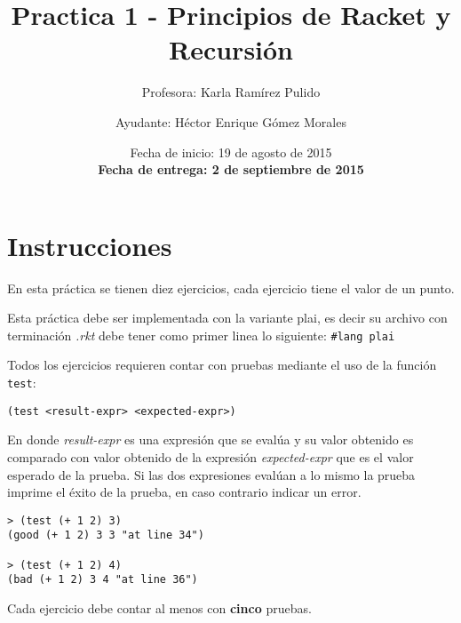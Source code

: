 \documentclass{article}
\author{Profesora: Karla Ramírez Pulido \and
  Ayudante: Héctor Enrique Gómez Morales}
\title{Practica 1 - Principios de Racket y Recursión}
\date{Fecha de inicio: 19 de agosto de 2015\\
  \textbf{Fecha de entrega: 2 de septiembre de 2015}}
\begin{document}
\maketitle
\section{Instrucciones}
En esta práctica se tienen diez ejercicios, cada ejercicio
tiene el valor de un punto.

Esta práctica debe ser implementada con la variante plai, es decir
su archivo con terminación \textit{.rkt} debe tener como primer linea lo siguiente:
\texttt{\#lang plai}

Todos los ejercicios requieren contar con pruebas mediante el uso de
la función \texttt{test}:
\begin{verbatim}
(test <result-expr> <expected-expr>)
\end{verbatim}

En donde \textit{result-expr} es una expresión que se evalúa y su valor obtenido
es comparado con valor obtenido de la expresión \textit{expected-expr} que es el
valor esperado de la prueba. Si las dos expresiones evalúan a lo mismo la prueba
imprime el éxito de la prueba, en caso contrario indicar un error.

\begin{verbatim}
> (test (+ 1 2) 3)
(good (+ 1 2) 3 3 "at line 34")

> (test (+ 1 2) 4)
(bad (+ 1 2) 3 4 "at line 36")
\end{verbatim}

Cada ejercicio debe contar al menos con \textbf{cinco} pruebas.
\end{document}
